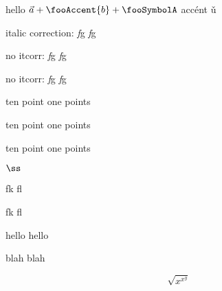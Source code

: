 \documentclass[11pt]{article}
\begin{document}
hello $\vec{a}+\fooAccent{b}+\fooSymbolA$ acc\'ent \v u

italic correction: \textit{f}g {\itshape f}g

\def\nocorrlist{g}
no itcorr: \textit{f}g {\itshape f}g

\def\nocorrlist{}
no itcorr: \textit{f\nocorr}g {\itshape f}g

{\fontsize{10.1pt}{10.1pt}\selectfont ten point one points}

{\fontsize{10.1pt}{10.1pt}\selectfont ten point one points}

{\fontsize{10.1pt}{10.1pt}\selectfont ten point one points}

$\ss$ %

fk fl

\selectfont

fk fl

hello \selectfont hello

blah \fontsize{18.7}{0}\selectfont blah

\[
\sqrt{x^{x^y}}
\]
\end{document}
